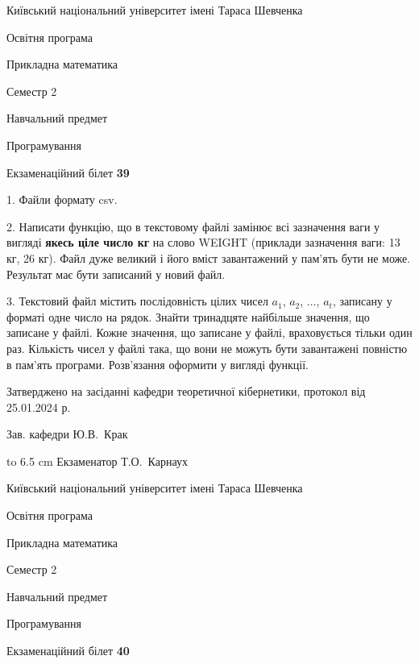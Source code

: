 \documentclass[12pt, ukrainian]{article}
\begin{document}
\vspace{0.9cm}
{{\begin {scriptsize}\par
{ \center  Київський національний університет імені Тараса Шевченка \par}
{\parbox {5 cm}{Освітня програма \hfill}{\parbox {7 cm}{Прикладна математика\hfill}}\parbox {6 cm}{\hfill Семестр 2}}\par
{\parbox {5 cm} {Навчальний предмет \hfill}\parbox {7 cm}{Програмування \hfill}\parbox {6cm}{\hfill}\par}\vspace{-15pt} \end{scriptsize}}{\center Екзаменаційний білет \No \textbf { 39 }\par}}
{%
1. Файли формату csv.%
\par
2. Написати функцію, що в текстовому файлі замінює всі зазначення ваги у вигляді \textbf{якесь ціле число кг} на слово WEIGHT (приклади зазначення ваги: 13 кг, 26   кг). Файл дуже великий і його вміст завантажений у пам'ять бути не може. Результат має бути записаний у новий файл.

\par
3. Текстовий файл містить послідовність цілих чисел $a_1$, $a_2$, $\ldots$, $a_t$, записану у форматі одне число на рядок. Знайти тринадцяте найбільше значення, що записане у файлі. Кожне значення, що записане у файлі, враховується тільки один раз. Кількість чисел у файлі така, що вони не можуть бути завантажені повністю в пам'ять програми. Розв'язання оформити у вигляді функції.

}
{\smallskip\smallskip \begin {scriptsize} Затверджено на засіданні кафедри теоретичної кібернетики, протокол   від   25.01.2024 р.\par\smallskip\smallskip\smallskip\smallskip
{\parbox {6.5 cm} {Зав. кафедри \dotfill Ю.В.~Крак}}\hspace {0.7cm} {\hbox to 6.5 cm { Екзаменатор \dotfill Т.О.~Карнаух}} \end{scriptsize}}
\newpage
{{\begin {scriptsize}\par
{ \center  Київський національний університет імені Тараса Шевченка \par}
{\parbox {5 cm}{Освітня програма \hfill}{\parbox {7 cm}{Прикладна математика\hfill}}\parbox {6 cm}{\hfill Семестр 2}}\par
{\parbox {5 cm} {Навчальний предмет \hfill}\parbox {7 cm}{Програмування \hfill}\parbox {6cm}{\hfill}\par}\vspace{-15pt} \end{scriptsize}}{\center Екзаменаційний білет \No \textbf { 40 }\par}}
\end{document}
